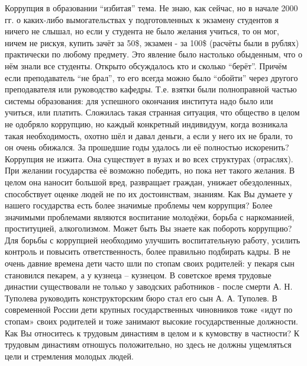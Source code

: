 \begin{drama}
	\maxspeaks Коррупция в образовании “избитая” тема. Не знаю, как сейчас, но в начале 2000 гг. о каких-либо вымогательствах у подготовленных к экзамену студентов я ничего не слышал, но если у студента не было желания учиться, то он мог, ничем не рискуя, купить зачёт за 50\$, экзамен - за 100\$ (расчёты были в рублях) практически по любому предмету. Это явление было настолько обыденным, что о нём знали все студенты. Открыто обсуждалось кто и сколько “берёт”. Причём если преподаватель “не брал”, то его всегда можно было “обойти” через другого преподавателя или руководство кафедры. Т.е. взятки были полноправной частью системы образования: для успешного окончания института надо было или учиться, или платить. Сложилась такая странная ситуация, что общество в целом не одобряло коррупцию, но каждый конкретный индивидуум, когда возникала такая необходимость, охотно шёл и давал деньги, а если у него их не брали, то он очень обижался. За прошедшие годы удалось ли её полностью искоренить?
	\michaelspeaks Коррупция не изжита. Она существует в вузах и во всех структурах (отраслях). При желании государства её возможно победить, но пока нет такого желания. В целом она наносит большой вред, развращает граждан, унижает обездоленных, способствует оценке людей не по их достоинствам, знаниям.
	\maxspeaks Как Вы думаете у нашего государства есть более значимые проблемы чем коррупция?
	\michaelspeaks Более значимыми проблемами являются воспитание молодёжи, борьба с наркоманией, проституцией, алкоголизмом.
	\maxspeaks Может быть Вы знаете как побороть коррупцию? 
	\michaelspeaks Для борьбы с коррупцией необходимо улучшить воспитательную работу, усилить контроль и повысить ответственность, более правильно подбирать кадры.
	\maxspeaks В не очень давние времена дети часто шли по стопам своих родителей: у пекаря сын становился пекарем, а у кузнеца – кузнецом. В советское время трудовые династии существовали не только у заводских работников - после смерти А. Н. Туполева руководить конструкторским бюро стал его сын А. А. Туполев. В современной России дети крупных государственных чиновников тоже «идут по стопам» своих родителей и тоже занимают высокие государственные должности. Как Вы относитесь к трудовым династиям в целом и к кумовству в частности?
	\michaelspeaks К трудовым династиям отношусь положительно, но здесь не должны ущемляться цели и стремления молодых людей.
	

\end{drama}
